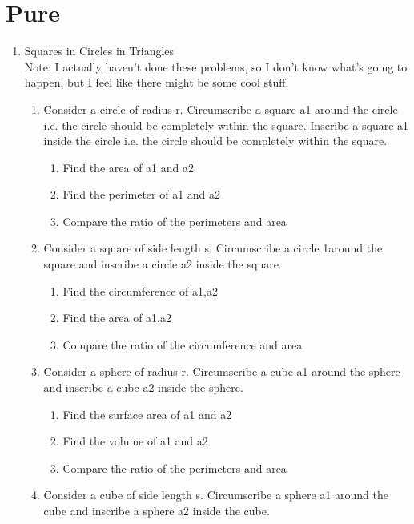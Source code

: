 \documentclass{article}
\begin{document}
\section{Pure}
\begin{enumerate}
    \item Squares in Circles in Triangles\\
    Note: I actually haven't done these problems, so I don't know what's going to happen, but I feel like there might be some cool stuff.
    \begin{enumerate}
        \item Consider a circle of radius r. Circumscribe a square a1 around the circle i.e. the circle should be completely within the square. Inscribe a square a1 inside the circle i.e. the circle should be completely within the square.
        \begin{enumerate}
            \item Find the area of a1 and a2
            \item Find the perimeter of a1 and a2
            \item Compare the ratio of the perimeters and area
        \end{enumerate}
        \item Consider a square of side length s. Circumscribe a circle 1around the square and inscribe a circle a2 inside the square.
        \begin{enumerate}
            \item Find the circumference of a1,a2
            \item Find the area of a1,a2
            \item Compare the ratio of the circumference and area
        \end{enumerate}
        \item Consider a sphere of radius r. Circumscribe a cube a1 around the sphere and inscribe a cube a2 inside the sphere.
        \begin{enumerate}
            \item Find the surface area of a1 and a2
            \item Find the volume of a1 and a2
            \item Compare the ratio of the perimeters and area
        \end{enumerate}
        \item Consider a cube of side length s. Circumscribe a sphere a1 around the cube and inscribe a sphere a2 inside the cube.
        \begin{enumerate}

\end{enumerate}
\end{enumerate}
\end{enumerate}
\end{document}
